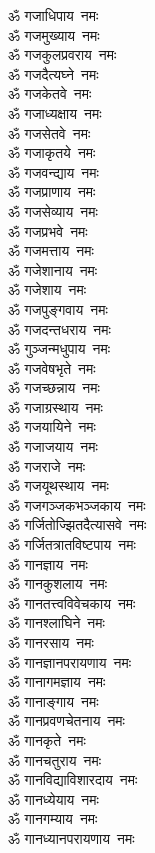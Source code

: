 \begin{multicols}{2}
\begin{flushleft}
ॐ गजाधिपाय~नमः\\
ॐ गजमुख्याय~नमः\\
ॐ गजकुलप्रवराय~नमः\\
ॐ गजदैत्यघ्ने~नमः\\
ॐ गजकेतवे~नमः\\
ॐ गजाध्यक्षाय~नमः\\
ॐ गजसेतवे~नमः\\
ॐ गजाकृतये~नमः\\
ॐ गजवन्द्याय~नमः\hfill{}\\
ॐ गजप्राणाय~नमः\\
ॐ गजसेव्याय~नमः\\
ॐ गजप्रभवे~नमः\\
ॐ गजमत्ताय~नमः\\
ॐ गजेशानाय~नमः\\
ॐ गजेशाय~नमः\\
ॐ गजपुङ्गवाय~नमः\\
ॐ गजदन्तधराय~नमः\\
ॐ गुञ्जन्मधुपाय~नमः\\
ॐ गजवेषभृते~नमः\hfill{}\\
ॐ गजच्छन्नाय~नमः\\
ॐ गजाग्रस्थाय~नमः\\
ॐ गजयायिने~नमः\\
ॐ गजाजयाय~नमः\\
ॐ गजराजे~नमः\\
ॐ गजयूथस्थाय~नमः\\
ॐ गजगञ्जकभञ्जकाय~नमः\\
ॐ गर्जितोज्झितदैत्यासवे~नमः\\
ॐ गर्जितत्रातविष्टपाय~नमः\\
ॐ गानज्ञाय~नमः\hfill{}\\
ॐ गानकुशलाय~नमः\\
ॐ गानतत्त्वविवेचकाय~नमः\\
ॐ गानश्लाघिने~नमः\\
ॐ गानरसाय~नमः\\
ॐ गानज्ञानपरायणाय~नमः\\
ॐ गानागमज्ञाय~नमः\\
ॐ गानाङ्गाय~नमः\\
ॐ गानप्रवणचेतनाय~नमः\\
ॐ गानकृते~नमः\\
ॐ गानचतुराय~नमः\hfill{}\\
ॐ गानविद्याविशारदाय~नमः\\
ॐ गानध्येयाय~नमः\\
ॐ गानगम्याय~नमः\\
ॐ गानध्यानपरायणाय~नमः\\

\end{flushleft}
\end{multicols}
